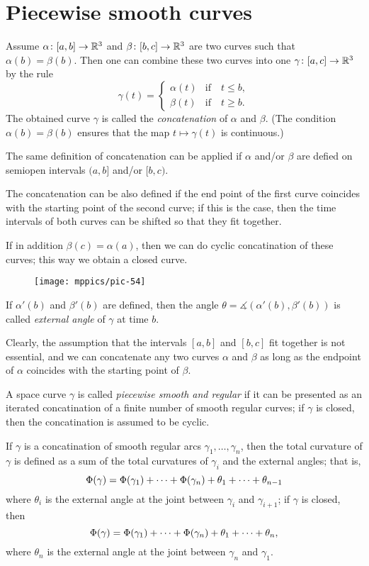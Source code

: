 \section*{Piecewise smooth curves}



Assume $\alpha\colon[a,b]\to \mathbb{R}^3$ and $\beta\:[b,c]\z\to \RR^3$ are two curves such that $\alpha(b)=\beta(b)$.
Then one can combine these two curves into one $\gamma\:[a,c]\z\to \RR^3$ by the rule 
\[\gamma(t)=
\begin{cases}
\alpha(t)&\text{if}\quad t\le b,
\\
\beta(t)&\text{if}\quad t\ge b.
\end{cases}
\]
The obtained curve $\gamma$ is called the 
\emph{concatenation} of $\alpha$ and $\beta$. %
(The condition $\alpha(b)=\beta(b)$ ensures that the map $t\mapsto\gamma(t)$ is continuous.)

The same definition of concatenation can be applied if $\alpha$ and/or $\beta$ are defied on semiopen intervals 
$(a,b]$ and/or $[b,c)$.

The concatenation can be also defined if the end point of the first curve coincides with the starting point of the second curve;
if this is the case, then the time intervals of both curves can be shifted so that they fit together. 

If in addition $\beta(c)=\alpha(a)$, then we can do cyclic concatination of these curves;
this way we obtain a closed curve.

\begin{wrapfigure}{o}{25 mm}
\vskip-0mm
\centering
\texttt{[image: mppics/pic-54]}
\end{wrapfigure}

If $\alpha'(b)$ and $\beta'(b)$ are defined, then the angle $\theta=\measuredangle(\alpha'(b),\beta'(b))$ is called \emph{external angle} of $\gamma$ at time $b$.

Clearly, the assumption that the intervals $[a,b]$ and $[b,c]$ fit together is not essential, and we can concatenate any two curves $\alpha$ and $\beta$ as long as the endpoint of $\alpha$ coincides with the starting point of $\beta$. 

A space curve $\gamma$ is called \emph{piecewise smooth and regular} if it can be presented as an iterated concatination of a finite number of smooth regular curves; if $\gamma$ is closed, then the  concatination is assumed to be cyclic.

If $\gamma$ is a concatination of smooth regular arcs $\gamma_1,\dots,\gamma_n$, then the total curvature of $\gamma$ is defined as a sum of the total curvatures of $\gamma_i$ and the external angles;
that is, 
\[\Phi({\gamma})=\Phi({\gamma_1})+\dots+\Phi({\gamma_n})+\theta_1+\dots+\theta_{n-1}\]
where $\theta_i$ is the external angle at the joint between $\gamma_i$ and $\gamma_{i+1}$;
if $\gamma$ is closed, then 
\[\Phi({\gamma})=\Phi({\gamma_1})+\dots+\Phi({\gamma_n})+\theta_1+\dots+\theta_{n},\]
where $\theta_n$ is the external angle at the joint between $\gamma_n$ and $\gamma_1$.


